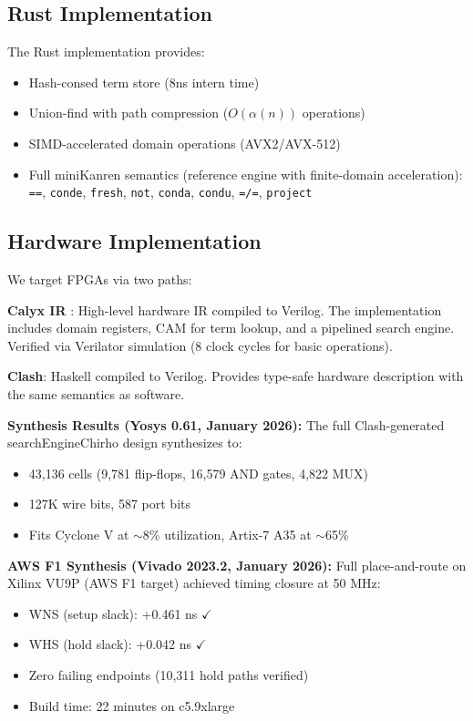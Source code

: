 \documentclass[11pt,a4paper]{article}
\begin{document}
\subsection{Rust Implementation}

The Rust implementation provides:
\begin{itemize}
  \item Hash-consed term store (8ns intern time)
  \item Union-find with path compression ($O(\alpha(n))$ operations)
  \item SIMD-accelerated domain operations (AVX2/AVX-512)
  \item Full miniKanren semantics (reference engine with finite-domain acceleration): \texttt{==}, \texttt{conde}, \texttt{fresh}, \texttt{not}, \texttt{conda}, \texttt{condu}, \texttt{=/=}, \texttt{project}
\end{itemize}

\subsection{Hardware Implementation}

We target FPGAs via two paths:

\textbf{Calyx IR} \cite{calyx_chirho}: High-level hardware IR compiled to Verilog.
The implementation includes domain registers, CAM for term lookup, and a pipelined search engine.
Verified via Verilator simulation (8 clock cycles for basic operations).

\textbf{Clash}: Haskell compiled to Verilog.
Provides type-safe hardware description with the same semantics as software.

\textbf{Synthesis Results (Yosys 0.61, January 2026):}
The full Clash-generated searchEngineChirho design synthesizes to:
\begin{itemize}
  \item 43,136 cells (9,781 flip-flops, 16,579 AND gates, 4,822 MUX)
  \item 127K wire bits, 587 port bits
  \item Fits Cyclone V at $\sim$8\% utilization, Artix-7 A35 at $\sim$65\%
\end{itemize}

\textbf{AWS F1 Synthesis (Vivado 2023.2, January 2026):}
Full place-and-route on Xilinx VU9P (AWS F1 target) achieved timing closure at 50 MHz:
\begin{itemize}
  \item WNS (setup slack): +0.461 ns $\checkmark$
  \item WHS (hold slack): +0.042 ns $\checkmark$
  \item Zero failing endpoints (10,311 hold paths verified)
  \item Build time: 22 minutes on c5.9xlarge
\end{itemize}
\end{document}
